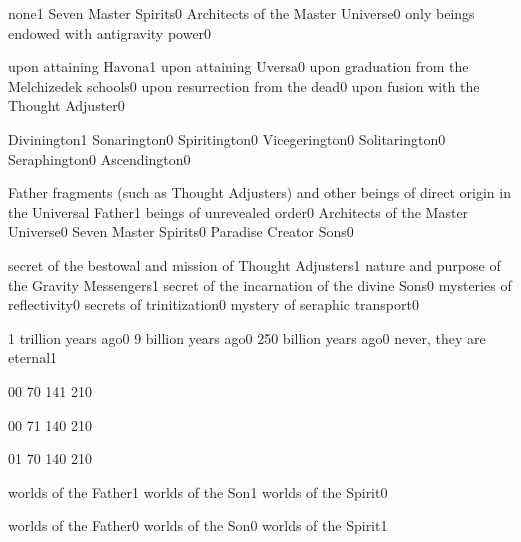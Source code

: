 {none}{1}
{Seven Master Spirits}{0}
{Architects of the Master Universe}{0}
{only beings endowed with antigravity power}{0}
\qstop

{upon attaining Havona}{1}
{upon attaining Uversa}{0}
{upon graduation from the Melchizedek schools}{0}
{upon resurrection from the dead}{0}
{upon fusion with the Thought Adjuster}{0}
\qstop

{Divinington}{1}
{Sonarington}{0}
{Spiritington}{0}
{Vicegerington}{0}
{Solitarington}{0}
{Seraphington}{0}
{Ascendington}{0}
\qstop

{Father fragments (such as Thought Adjusters) and other beings of direct origin in the Universal Father}{1}
{beings of unrevealed order}{0}
{Architects of the Master Universe}{0}
{Seven Master Spirits}{0}
{Paradise Creator Sons}{0}
\qstop

{secret of the bestowal and mission of Thought Adjusters}{1}
{nature and purpose of the Gravity Messengers}{1}
{secret of the incarnation of the divine Sons}{0}
{mysteries of reflectivity}{0}
{secrets of trinitization}{0}
{mystery of seraphic transport}{0}
\qstop

{1 trillion years ago}{0}
{9 billion years ago}{0}
{250 billion years ago}{0}
{never, they are eternal}{1}
\qstop

{0}{0}
{7}{0}
{14}{1}
{21}{0}
\qstop

{0}{0}
{7}{1}
{14}{0}
{21}{0}
\qstop

{0}{1}
{7}{0}
{14}{0}
{21}{0}
\qstop

{worlds of the Father}{1}
{worlds of the Son}{1}
{worlds of the Spirit}{0}
\qstop

{worlds of the Father}{0}
{worlds of the Son}{0}
{worlds of the Spirit}{1}
\qstop

